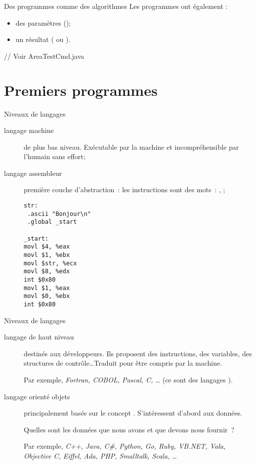 \begin{frame}[fragile]{Des programmes comme des algorithmes}
  Les programmes ont également :
  \begin{itemize}
    \item des paramètres ();
    \item un résultat ( ou ).
  \end{itemize}

  \vfill

  \pause
  \begin{java}
    // Voir AreaTestCmd.java
  \end{java}
\end{frame}

\section{Premiers programmes}
\frame{\sectionpage}
\begin{frame}[fragile]{Niveaux de langages}
  \begin{description}
    \item[langage machine]
      de plus bas niveau. Exécutable par la machine et incompréhensible
      par l'humain sans effort;

    \item[langage assembleur]
      première couche d'abstraction~: les instructions
      sont des mots~: , ;
      {\footnotesize
      \begin{verbatim}
str:
 .ascii "Bonjour\n"
 .global _start

_start:
movl $4, %eax
movl $1, %ebx
movl $str, %ecx
movl $8, %edx
int $0x80
movl $1, %eax
movl $0, %ebx
int $0x80
\end{verbatim}
}
  \end{description}
\end{frame}
\begin{frame}[fragile]{Niveaux de langages}
  \begin{description}
    \item[langage de haut niveau]
      destinés aux développeurs. Ils proposent des instructions, des variables,
      des structures de contrôle\dots Traduit pour être compris par la machine.

      Par exemple, \textit{Fortran, COBOL, Pascal, C, \dots} (ce sont des
      langages ).

    \item[langage orienté objets]
      principalement basés sur le concept . S'intéressent
      d'abord aux données.

      Quelles sont les données que nous avons et que devons nous fournir~?

      Par exemple, {\it C++, Java, C\#, Python, Go, Ruby, VB.NET, Vala,}
      \textit{Objective C, Eiffel, Ada, PHP, Smalltalk, Scala, \dots}
  \end{description}
\end{frame}
